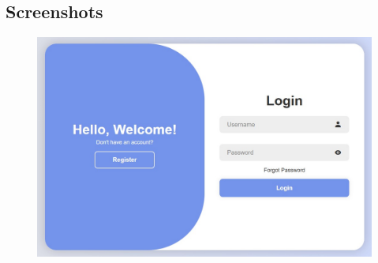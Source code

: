 \subsection{Screenshots}
\begin{figure}[H]
\centering
\begin{minipage}{0.6\textwidth}
    \centering
    \includegraphics[width=\linewidth]{4/Website_Login.jpg}
    \label{fig:authentication1}
\end{minipage}%
\hspace{5mm}
\begin{minipage}{0.3\textwidth}
    \centering

\end{minipage}
\end{figure}
